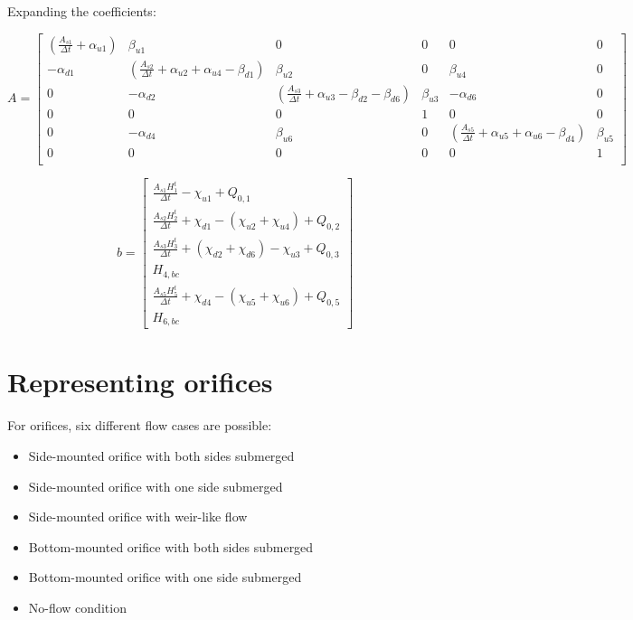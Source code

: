 \documentclass[11pt]{article}
\begin{document}
Expanding the coefficients:

\begin{equation}
  A = 
  \begin{bmatrix}
   ( \frac{A_{s1}}{\Delta t} + \alpha_{u1} ) & \beta_{u1} & 0 & 0 & 0 & 0 \\ 
   - \alpha_{d1} & ( \frac{A_{s2}}{\Delta t} + \alpha_{u2} + \alpha_{u4} - \beta_{d1} ) & \beta_{u2} & 0 & \beta_{u4} & 0 \\
   0 & - \alpha_{d2} & ( \frac{A_{s3}}{\Delta t} + \alpha_{u3} - \beta_{d2} - \beta_{d6} ) & \beta_{u3} & - \alpha_{d6} & 0 \\
   0 & 0 & 0 & 1 & 0 & 0 \\
   0 & - \alpha_{d4} & \beta_{u6} & 0 & ( \frac{A_{s5}}{\Delta t} + \alpha_{u5} + \alpha_{u6} - \beta_{d4} ) & \beta_{u5} \\
   0 & 0 & 0 & 0 & 0 & 1 \\
  \end{bmatrix}
\end{equation}

\begin{equation}
  b = 
  \begin{bmatrix}
    \frac{A_{s1} H_1^t}{\Delta t} - \chi_{u1} + Q_{0,1} \\
    \frac{A_{s2} H_2^t}{\Delta t} + \chi_{d1} - (\chi_{u2} + \chi_{u4}) + Q_{0,2} \\
    \frac{A_{s3} H_3^t}{\Delta t} + (\chi_{d2} + \chi_{d6}) - \chi_{u3} + Q_{0,3} \\
    H_{4,bc} \\
    \frac{A_{s5} H_5^t}{\Delta t} + \chi_{d4} - (\chi_{u5} + \chi_{u6}) + Q_{0,5} \\
    H_{6,bc}
  \end{bmatrix}
\end{equation}

\section{Representing orifices}

For orifices, six different flow cases are possible:

\begin{itemize}
\item Side-mounted orifice with both sides submerged
\item Side-mounted orifice with one side submerged
\item Side-mounted orifice with weir-like flow
\item Bottom-mounted orifice with both sides submerged
\item Bottom-mounted orifice with one side submerged
\item No-flow condition
\end{itemize}
\end{document}
